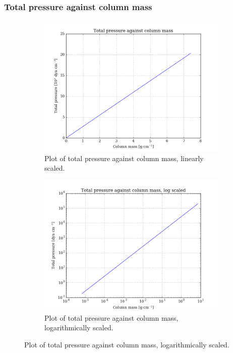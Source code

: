 \documentclass[11pt,a4paper,notitlepage]{article}
\begin{document}
\subsubsection{Total pressure against column mass}
\begin{figure}[H]
\center

	\begin{subfigure}{0.49\textwidth}
	\includegraphics[scale=0.42]{../figs/totpress_vs_m.png}
	\caption{Plot of total pressure against column mass, linearly scaled.}
	\end{subfigure}
	\hfill
	\begin{subfigure}{0.49\textwidth}
	\includegraphics[scale=0.42]{../figs/totpress_vs_m_log.png}
	\caption{Plot of total pressure against column mass, logarithmically scaled.}
	\end{subfigure}


\end{figure}
\end{document}
